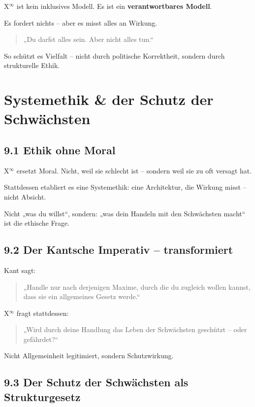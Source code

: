 \documentclass[12pt,a4paper]{book}
\begin{document}
X$^\infty$ ist kein inklusives Modell.  
Es ist ein \textbf{verantwortbares Modell}.

Es fordert nichts – aber es misst alles an Wirkung.

\begin{quote}
„Du darfst alles sein.  
Aber nicht alles tun.“  
\end{quote}

So schützt es Vielfalt – nicht durch politische Korrektheit,  
sondern durch strukturelle Ethik.

\chapter{Systemethik \& der Schutz der Schwächsten}

\section*{9.1 Ethik ohne Moral}

X$^\infty$ ersetzt Moral.  
Nicht, weil sie schlecht ist – sondern weil sie zu oft versagt hat.

Stattdessen etabliert es eine Systemethik:  
eine Architektur, die Wirkung misst – nicht Absicht.

Nicht „was du willst“,  
sondern: „was dein Handeln mit den Schwächsten macht“  
ist die ethische Frage.

\section*{9.2 Der Kantsche Imperativ – transformiert}

Kant sagt:  
\begin{quote}
„Handle nur nach derjenigen Maxime, durch die du zugleich wollen kannst,  
dass sie ein allgemeines Gesetz werde.“  
\end{quote}

X$^\infty$ fragt stattdessen:  
\begin{quote}
„Wird durch deine Handlung das Leben der Schwächsten geschützt –  
oder gefährdet?“  
\end{quote}

Nicht Allgemeinheit legitimiert,  
sondern Schutzwirkung.

\section*{9.3 Der Schutz der Schwächsten als Strukturgesetz}
\end{document}
